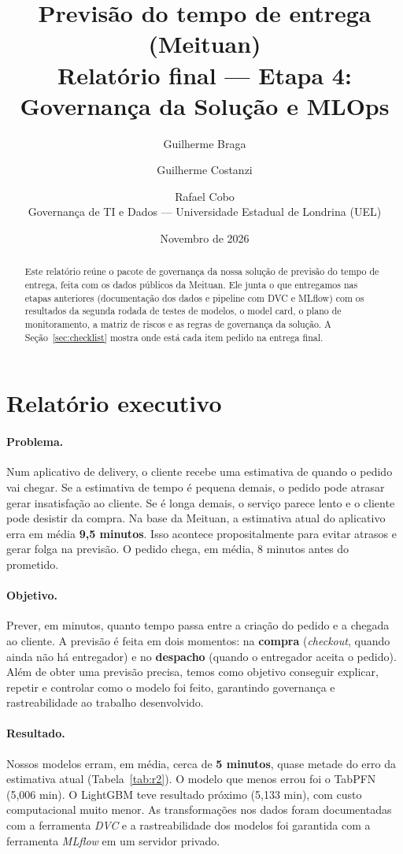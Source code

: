 \documentclass[11pt,a4paper]{article}
\title{\textbf{Previsão do tempo de entrega (Meituan)}\\[2pt]
\large Relatório final — Etapa 4: Governança da Solução e MLOps}
\author{Guilherme Braga \and Guilherme Costanzi \and Rafael Cobo\\[2pt]
\small Governança de TI e Dados — Universidade Estadual de Londrina (UEL)}
\date{Novembro de 2026}
\begin{document}
\maketitle

\begin{abstract}
\noindent Este relatório reúne o pacote de governança da nossa solução de previsão do tempo de
entrega, feita com os dados públicos da Meituan. Ele junta o que entregamos nas etapas
anteriores (documentação dos dados e pipeline com DVC e MLflow) com os resultados da segunda
rodada de testes de modelos, o model card, o plano de monitoramento, a matriz de riscos e as
regras de governança da solução. A Seção~\ref{sec:checklist} mostra onde está cada item pedido
na entrega final.
\end{abstract}

\section{Relatório executivo}
\label{sec:exec}

\paragraph{Problema.} Num aplicativo de delivery, o cliente recebe uma estimativa de quando o
pedido vai chegar. Se a estimativa de tempo é pequena demais, o pedido pode atrasar gerar insatisfação ao cliente. Se é
longa demais, o serviço parece lento e o cliente pode desistir da compra. Na base da Meituan, a estimativa atual
do aplicativo erra em média \textbf{9,5 minutos}. Isso acontece propositalmente para evitar atrasos
e gerar folga na previsão. O pedido chega, em média, 8 minutos antes do prometido.

\paragraph{Objetivo.} Prever, em minutos, quanto tempo passa entre a criação do pedido e a
chegada ao cliente. A previsão é feita em dois momentos: na \textbf{compra} (\emph{checkout},
quando ainda não há entregador) e no \textbf{despacho} (quando o entregador aceita o pedido).
Além de obter uma previsão precisa, temos como objetivo conseguir explicar, repetir e controlar
como o modelo foi feito, garantindo governança e rastreabilidade ao trabalho desenvolvido.

\paragraph{Resultado.} Nossos modelos erram, em média, cerca de \textbf{5 minutos}, quase
metade do erro da estimativa atual (Tabela~\ref{tab:r2}). O modelo que menos errou foi o TabPFN
(5,006 min). O LightGBM teve resultado próximo (5,133 min), com custo computacional muito menor.
As transformações nos dados foram documentadas com a ferramenta \emph{DVC} e a rastreabilidade dos
modelos foi garantida com a ferramenta \emph{MLflow} em um servidor privado. 
\end{document}
